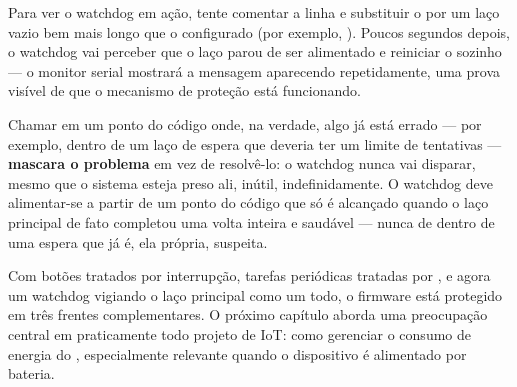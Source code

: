 \begin{dica}
Para ver o watchdog em ação, tente comentar a linha  e substituir o  por um laço vazio bem mais longo que o  configurado (por exemplo, ). Poucos segundos depois, o watchdog vai perceber que o laço parou de ser alimentado e reiniciar o \ESP{} sozinho — o monitor serial mostrará a mensagem  aparecendo repetidamente, uma prova visível de que o mecanismo de proteção está funcionando.
\end{dica}

\begin{atencao}
Chamar  em um ponto do código onde, na verdade, algo já está errado — por exemplo, dentro de um laço de espera que deveria ter um limite de tentativas — \textbf{mascara o problema} em vez de resolvê-lo: o watchdog nunca vai disparar, mesmo que o sistema esteja preso ali, inútil, indefinidamente. O watchdog deve alimentar-se a partir de um ponto do código que só é alcançado quando o laço principal de fato completou uma volta inteira e saudável — nunca de dentro de uma espera que já é, ela própria, suspeita.
\end{atencao}

Com botões tratados por interrupção, tarefas periódicas tratadas por , e agora um watchdog vigiando o laço principal como um todo, o firmware está protegido em três frentes complementares. O próximo capítulo aborda uma preocupação central em praticamente todo projeto de IoT: como gerenciar o consumo de energia do \ESP{}, especialmente relevante quando o dispositivo é alimentado por bateria.
